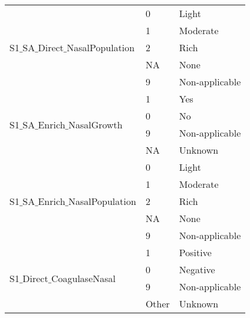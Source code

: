 \begin{table}[H]
\begin{tabular}{l | l | l}
            \multirow{5}{*}{S1$\_$SA$\_$Direct$\_$NasalPopulation} 
                                         & \multicolumn{1}{l}{0}  & \multicolumn{1}{l}{Light}          \\\cline{2-3}
                                         & \multicolumn{1}{l}{1}  & \multicolumn{1}{l}{Moderate}       \\\cline{2-3}
                                         & \multicolumn{1}{l}{2}  & \multicolumn{1}{l}{Rich}           \\\cline{2-3}
					                     & \multicolumn{1}{l}{NA} & \multicolumn{1}{l}{None}           \\\cline{2-3}
                                         & \multicolumn{1}{l}{9}  & \multicolumn{1}{l}{Non-applicable} \\\hline
                                         
            \multirow{4}{*}{S1$\_$SA$\_$Enrich$\_$NasalGrowth} 
                                         & \multicolumn{1}{l}{1}     & \multicolumn{1}{l}{Yes}            \\\cline{2-3}
                                         & \multicolumn{1}{l}{0}     & \multicolumn{1}{l}{No}             \\\cline{2-3}
                                         & \multicolumn{1}{l}{9}     & \multicolumn{1}{l}{Non-applicable} \\\cline{2-3}
                                         & \multicolumn{1}{l}{NA}    & \multicolumn{1}{l}{Unknown}        \\\hline

            \multirow{5}{*}{S1$\_$SA$\_$Enrich$\_$NasalPopulation} 
                                         & \multicolumn{1}{l}{0}  & \multicolumn{1}{l}{Light}          \\\cline{2-3}
                                         & \multicolumn{1}{l}{1}  & \multicolumn{1}{l}{Moderate}       \\\cline{2-3}
                                         & \multicolumn{1}{l}{2}  & \multicolumn{1}{l}{Rich}           \\\cline{2-3}
					                     & \multicolumn{1}{l}{NA} & \multicolumn{1}{l}{None}           \\\cline{2-3}
                                         & \multicolumn{1}{l}{9}  & \multicolumn{1}{l}{Non-applicable} \\\hline

            \multirow{4}{*}{S1$\_$Direct$\_$CoagulaseNasal} 
                                         & \multicolumn{1}{l}{1}     & \multicolumn{1}{l}{Positive}       \\\cline{2-3}
                                         & \multicolumn{1}{l}{0}     & \multicolumn{1}{l}{Negative}       \\\cline{2-3}
                                         & \multicolumn{1}{l}{9}     & \multicolumn{1}{l}{Non-applicable} \\\cline{2-3}
                                         & \multicolumn{1}{l}{Other} & \multicolumn{1}{l}{Unknown}        \\\hline


\end{tabular}
\end{table}
